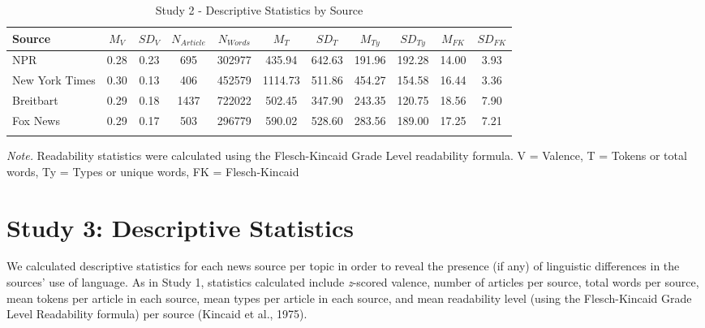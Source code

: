 \documentclass[
  man,floatsintext]{apa6}
\begin{document}
\begin{table}[h]

\begin{center}
\begin{threeparttable}

\caption{\label{tab:exp1-source-descriptives}Study 2 - Descriptive Statistics by Source}

\footnotesize{

\begin{tabular}{lcccccccccc}
\toprule
Source & $M_V$ & $SD_V$ & $N_{Article}$ & $N_{Words}$ & $M_T$ & $SD_T$ & $M_{Ty}$ & $SD_{Ty}$ & $M_{FK}$ & $SD_{FK}$\\
\midrule
NPR & 0.28 & 0.23 & 695 & 302977 & 435.94 & 642.63 & 191.96 & 192.28 & 14.00 & 3.93\\
New York Times & 0.30 & 0.13 & 406 & 452579 & 1114.73 & 511.86 & 454.27 & 154.58 & 16.44 & 3.36\\
Breitbart & 0.29 & 0.18 & 1437 & 722022 & 502.45 & 347.90 & 243.35 & 120.75 & 18.56 & 7.90\\
Fox News & 0.29 & 0.17 & 503 & 296779 & 590.02 & 528.60 & 283.56 & 189.00 & 17.25 & 7.21\\
\bottomrule
\addlinespace
\end{tabular}

}

\begin{tablenotes}[para]
\normalsize{\textit{Note.} Readability statistics were calculated using the Flesch-Kincaid Grade Level readability formula. V = Valence, T = Tokens or total words, Ty = Types or unique words, FK = Flesch-Kincaid}
\end{tablenotes}

\end{threeparttable}
\end{center}

\end{table}

\section{Study 3: Descriptive Statistics}\label{study-3-descriptive-statistics}

We calculated descriptive statistics for each news source per topic in
order to reveal the presence (if any) of linguistic differences in the
sources' use of language. As in Study 1, statistics calculated include
\emph{z}-scored valence, number of articles per source, total words per
source, mean tokens per article in each source, mean types per article
in each source, and mean readability level (using the Flesch-Kincaid
Grade Level Readability formula) per source (Kincaid et al., 1975).
\end{document}
